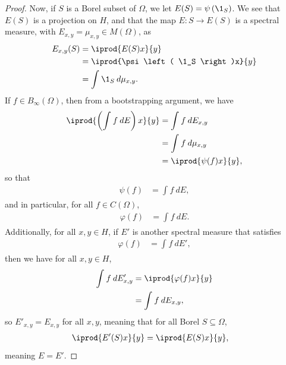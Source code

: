 \documentclass[10pt]{mypackage}
\begin{document}
\begin{proof}
  Now, if $S$ is a Borel subset of $\Omega$, we let $E(S) = \psi\left(\1_S\right)$. We see that $E(S)$ is a projection on $H$, and that the map $E\colon S\rightarrow E(S)$ is a spectral measure, with $E_{x,y} = \mu_{x,y}\in M(\Omega)$, as
  \begin{align*}
    E_{x,y}(S) &= \iprod{E(S)x}{y}\\
               &= \iprod{\psi\left( \1_S \right)x}{y}\\
               &= \int_{}^{} \1_S\:d\mu_{x,y}.
  \end{align*}
  If $f\in B_{\infty}(\Omega)$, then from a bootstrapping argument, we have
  \begin{align*}
    \iprod{\left( \int_{}^{} f\:dE \right)x}{y} &= \int_{}^{} f\:dE_{x,y}\\
                                                &= \int_{}^{} f\:d\mu_{x,y}\\
                                                &= \iprod{\psi(f)x}{y},
  \end{align*}
  so that
  \begin{align*}
    \psi(f) &= \int_{}^{} f\:dE,
  \end{align*}
  and in particular, for all $f\in C(\Omega)$,
  \begin{align*}
    \varphi(f) &= \int_{}^{} f\:dE.
  \end{align*}
  Additionally, for all $x,y\in H$, if $E'$ is another spectral measure that satisfies
  \begin{align*}
    \varphi(f) &= \int_{}^{} f\:dE',
  \end{align*}
  then we have for all $x,y\in H$,
  \begin{align*}
    \int_{}^{} f\:dE'_{x,y} &= \iprod{\varphi(f)x}{y}\\
                            &= \int_{}^{} f\:dE_{x,y},
  \end{align*}
  so $E'_{x,y} = E_{x,y}$ for all $x,y$, meaning that for all Borel $S\subseteq \Omega$,
  \begin{align*}
    \iprod{E'(S)x}{y} &= \iprod{E(S)x}{y},
  \end{align*}
  meaning $E = E'$.


\end{proof}
\end{document}
